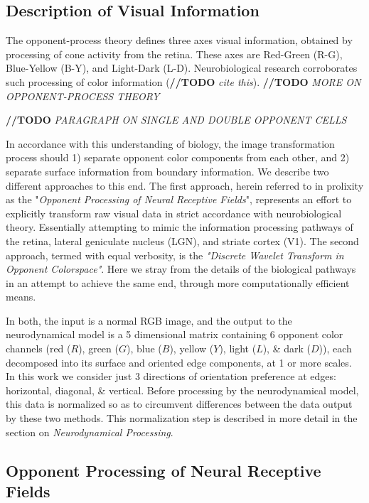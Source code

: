 \documentclass[journal,onecolumn]{IEEEtran}
\begin{document}
\subsection*{Description of Visual Information}

The opponent-process theory defines three axes visual information, obtained by processing of cone activity from the retina. These axes are Red-Green (R-G), Blue-Yellow (B-Y), and Light-Dark (L-D). Neurobiological research corroborates such processing of color information (\textbf{//TODO} \textit{cite this}). \textbf{//TODO} \textit{MORE ON OPPONENT-PROCESS THEORY}

\textbf{//TODO} \textit{PARAGRAPH ON SINGLE AND DOUBLE OPPONENT CELLS}

In accordance with this understanding of biology, the image transformation process should 1) separate opponent color components from each other, and 2) separate surface information from boundary information. We describe two different approaches to this end. The first approach, herein referred to in prolixity as the "\textit{Opponent Processing of Neural Receptive Fields}", represents an effort to explicitly transform raw visual data in strict accordance with neurobiological theory. Essentially attempting to mimic the information processing pathways of the retina, lateral geniculate nucleus (LGN), and striate cortex (V1). The second approach, termed with equal verbosity, is the \textit{"Discrete Wavelet Transform in Opponent Colorspace"}. Here we stray from the details of the biological pathways in an attempt to achieve the same end, through more computationally efficient means.

In both, the input is a normal RGB image, and the output to the neurodynamical model is a 5 dimensional matrix containing 6 opponent color channels (red ($R$), green ($G$), blue ($B$), yellow ($Y$), light ($L$), \& dark ($D$)), each decomposed into its surface and oriented edge components, at 1 or more scales. In this work we consider just 3 directions of orientation preference at edges: horizontal, diagonal, \& vertical. Before processing by the neurodynamical model, this data is normalized so as to circumvent differences between the data output by these two methods. This normalization step is described in more detail in the section on \textit{Neurodynamical Processing}.

\subsection{Opponent Processing of Neural Receptive Fields}
\end{document}
